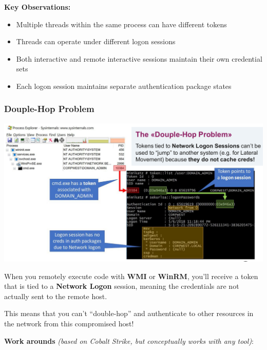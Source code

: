 \textbf{Key Observations:}
\begin{itemize}
   \item Multiple threads within the same process can have different tokens
   \item Threads can operate under different logon sessions
   \item Both interactive and remote interactive sessions maintain their own credential sets
   \item Each logon session maintains separate authentication package states
\end{itemize}


\subsubsection{Douple-Hop Problem}
\includegraphics[width=\textwidth]{resources/11-double-hop-problem.png}

When you remotely execute code with \textbf{WMI} or \textbf{WinRM}, you'll receive a token that is tied to a \textbf{Network Logon} session, meaning the credentials are not actually sent to the remote host.

This means that you can't ``double-hop'' and authenticate to other resources in the network from this compromised host!

\textbf{Work arounds} \textit{(based on Cobalt Strike, but conceptually works with any tool)}:

